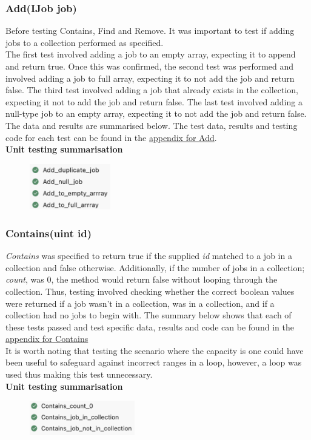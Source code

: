 \documentclass[a4paper]{article}
\begin{document}
\subsubsection{Add(IJob job)}
Before testing Contains, Find and Remove. It was important to test if adding jobs to a collection performed as specified.
\\[6pt] 
The first test involved adding a job to an empty array, expecting it to append and return true. Once this was confirmed, the second test was performed and involved adding a job to full array, expecting it to not add the job and return false. The third test involved adding a job that already exists in the collection, expecting it not to add the job and return false. The last test involved adding a null-type job to an empty array, expecting it to not add the job and return false. The data and results are summarised below. The
test data, results and testing code for each test can be found in the \hyperlink{subsubsection.5.2.1}{appendix for Add}.
\\[6pt]
\textbf{Unit testing summarisation}
\begin{figure}[H]
   \includegraphics[height=2cm]{images/Add-summary.png}
\end{figure}

\subsubsection{Contains(uint id)}
\textit{Contains} was specified to return true if the supplied \textit{id} matched to a job in a collection and false otherwise. Additionally, if the number of jobs in a collection; \textit{count}, was $0$, the method would return false without looping through the collection. Thus, testing involved checking whether the correct boolean values were returned if a job wasn't in a collection, was in a collection, and if a collection had no jobs to begin with. The summary below shows that each of these tests passed and test specific data, results and code can be found in the \hyperlink{subsubsection.5.2.2}{appendix for Contains}
\\[6pt]
It is worth noting that testing the scenario where the capacity is one could have been useful to safeguard against incorrect ranges in a  loop, however, a  loop was used thus making this test unnecessary.
\\[6pt]
\textbf{Unit testing summarisation}
\begin{figure}[H]
   \includegraphics[height=1.5cm]{images/Contains-summary.png}
\end{figure}
\end{document}
